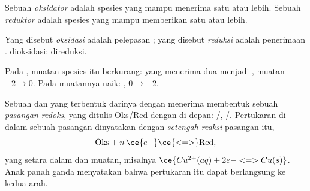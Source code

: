 \begin{definition}\label{def:g11:redox:oxidant}
Sebuah \emph{oksidator} adalah spesies yang mampu
menerima satu  atau lebih. Sebuah \emph{reduktor}
adalah spesies yang mampu memberikan satu  atau lebih.
\end{definition}

\begin{definition}\label{def:g11:redox:oxidation}
Yang disebut \emph{oksidasi} adalah pelepasan ;
yang disebut \emph{reduksi} adalah penerimaan .
 dioksidasi;  direduksi.
\end{definition}

\begin{remark}\label{rem:g11:redox:remember}
Pada \emph{}, muatan spesies itu berkurang:  yang
menerima dua  menjadi , muatan $+2 \to 0$. Pada 
muatannya naik: , $0 \to +2$.
\end{remark}

\begin{definition}\label{def:g11:redox:couple}
Sebuah  dan  yang terbentuk darinya dengan menerima
 membentuk sebuah \emph{pasangan redoks},
yang ditulis Oks/Red dengan  di depan: /,
/. Pertukaran  di dalam sebuah pasangan
dinyatakan dengan \emph{setengah reaksi}
pasangan itu,
\[
  \text{Oks} + n\,\ce{e-} \ce{<=>} \text{Red}, %
\]
yang setara dalam  dan muatan, misalnya
$\ce{Cu^{2+}(aq) + 2e- <=> Cu(s)}$. Anak panah ganda menyatakan bahwa
pertukaran itu dapat berlangsung ke kedua arah.
\end{definition}

